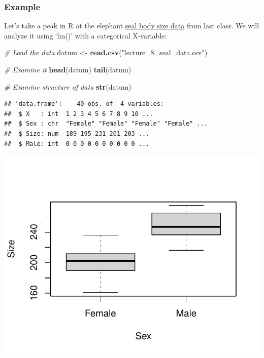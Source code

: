 \documentclass[
]{article}
\newenvironment{Shaded}{\begin{snugshade}}{\end{snugshade}}
\newcommand{\AttributeTok}[1]{\textcolor[rgb]{0.13,0.29,0.53}{#1}}
\newcommand{\CommentTok}[1]{\textcolor[rgb]{0.56,0.35,0.01}{\textit{#1}}}
\newcommand{\FunctionTok}[1]{\textcolor[rgb]{0.13,0.29,0.53}{\textbf{#1}}}
\newcommand{\NormalTok}[1]{#1}
\newcommand{\OtherTok}[1]{\textcolor[rgb]{0.56,0.35,0.01}{#1}}
\newcommand{\SpecialCharTok}[1]{\textcolor[rgb]{0.81,0.36,0.00}{\textbf{#1}}}
\newcommand{\StringTok}[1]{\textcolor[rgb]{0.31,0.60,0.02}{#1}}
\begin{document}
\subsubsection{Example}\label{example}

Let's take a peak in R at the elephant
\href{lecture_8_seal_data.csv}{seal body size data} from last class. We
will analyze it using `lm()' with a categorical X-variable:

\begin{Shaded}
\begin{Highlighting}[]
\CommentTok{\# Load the data}
\NormalTok{datum }\OtherTok{\textless{}{-}} \FunctionTok{read.csv}\NormalTok{(}\StringTok{"lecture\_8\_seal\_data.csv"}\NormalTok{)}

\CommentTok{\# Examine it}
\FunctionTok{head}\NormalTok{(datum)}
\FunctionTok{tail}\NormalTok{(datum)}

\CommentTok{\# Examine structure of data}
\FunctionTok{str}\NormalTok{(datum)}
\end{Highlighting}
\end{Shaded}

\begin{verbatim}
## 'data.frame':    40 obs. of  4 variables:
##  $ X   : int  1 2 3 4 5 6 7 8 9 10 ...
##  $ Sex : chr  "Female" "Female" "Female" "Female" ...
##  $ Size: num  189 195 231 201 203 ...
##  $ Male: int  0 0 0 0 0 0 0 0 0 0 ...
\end{verbatim}

\begin{Shaded}
\end{Shaded}

\includegraphics{lecture_9_files/figure-latex/seals-1.pdf}
\end{document}
